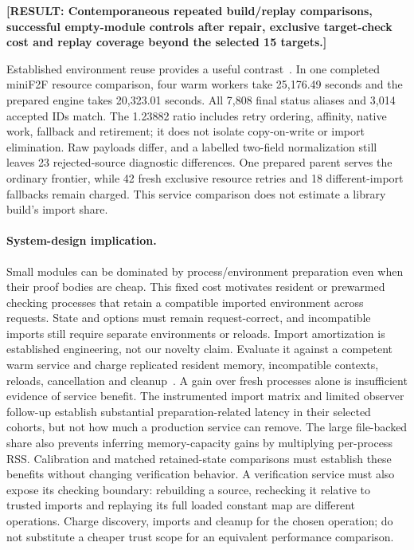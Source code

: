 \documentclass[10pt,twocolumn]{article}
\newcommand{\missing}[1]{\textbf{[RESULT: #1]}}
\begin{document}
\missing{Contemporaneous repeated build/replay comparisons, successful
empty-module controls after repair, exclusive target-check cost and
replay coverage beyond the selected 15 targets.}

Established environment reuse provides a useful contrast~\cite{repl,kimina}.
In one completed miniF2F resource comparison, four warm workers take
25,176.49 seconds and the prepared engine takes 20,323.01 seconds.
All 7,808 final status aliases and 3,014 accepted IDs match.
The 1.23882 ratio includes retry ordering, affinity, native work, fallback
and retirement; it does not isolate copy-on-write or import elimination.
Raw payloads differ, and a labelled two-field normalization still leaves
23 rejected-source diagnostic differences.
One prepared parent serves the ordinary frontier, while 42 fresh exclusive
resource retries and 18 different-import fallbacks remain charged.
This service comparison does not estimate a library build's import share.

\paragraph{System-design implication.}
Small modules can be dominated by process/environment preparation even when
their proof bodies are cheap. This fixed cost motivates resident or prewarmed
checking processes that retain a compatible imported environment across
requests. State and options must remain request-correct, and incompatible
imports still require separate environments or reloads.
Import amortization is established engineering, not our novelty claim.
Evaluate it against a competent warm service and charge replicated resident
memory, incompatible contexts, reloads, cancellation and cleanup~\cite{fork}.
A gain over fresh processes alone is insufficient evidence of service benefit.
The instrumented import matrix and limited observer follow-up establish
substantial preparation-related latency in their selected cohorts, but not
how much a production service can remove. The large file-backed share also prevents inferring memory-capacity
gains by multiplying per-process RSS. Calibration and matched retained-state
comparisons must establish these benefits without changing verification
behavior.
A verification service must also expose its checking boundary: rebuilding a
source, rechecking it relative to trusted imports and replaying its full
loaded constant map are different operations.
Charge discovery, imports and cleanup for the chosen operation; do not
substitute a cheaper trust scope for an equivalent performance comparison.
\end{document}
